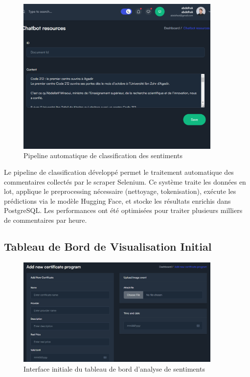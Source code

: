 \begin{figure}[H]
\centering
\includegraphics[width=0.9\textwidth]{assets/images/admin-doc.png}
\caption{Pipeline automatique de classification des sentiments}
\label{fig:classification-pipeline}
\end{figure}

Le pipeline de classification développé permet le traitement automatique des commentaires collectés par le scraper Selenium. Ce système traite les données en lot, applique le preprocessing nécessaire (nettoyage, tokenisation), exécute les prédictions via le modèle Hugging Face, et stocke les résultats enrichis dans PostgreSQL. Les performances ont été optimisées pour traiter plusieurs milliers de commentaires par heure.

\subsection{Tableau de Bord de Visualisation Initial}

\begin{figure}[H]
\centering
\includegraphics[width=0.9\textwidth]{assets/images/admin-add-certif.png}
\caption{Interface initiale du tableau de bord d'analyse de sentiments}
\label{fig:initial-dashboard}
\end{figure}

